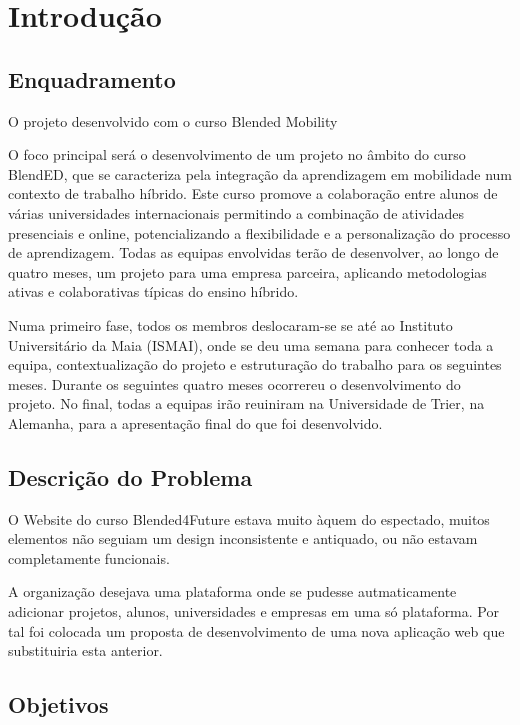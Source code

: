\chapter{Introdução}
\label{chap:introducao}

\section{Enquadramento}
\label{sec:introducao_enquadramento}

O projeto desenvolvido com o curso Blended Mobility

O foco principal será o desenvolvimento de um projeto no âmbito do curso BlendED, que se caracteriza pela integração da aprendizagem em mobilidade num contexto de trabalho híbrido. Este curso promove a colaboração entre alunos de várias universidades internacionais permitindo a combinação de atividades presenciais e online, potencializando a flexibilidade e a personalização do processo de aprendizagem. Todas as equipas envolvidas terão de desenvolver, ao longo de quatro meses, um projeto para uma empresa parceira, aplicando metodologias ativas e colaborativas típicas do ensino híbrido.

Numa primeiro fase, todos os membros deslocaram-se se até ao Instituto Universitário da Maia (ISMAI), onde se deu uma semana para conhecer toda a equipa, contextualização do projeto e estruturação do trabalho para os seguintes meses. Durante os seguintes quatro meses ocorrereu o desenvolvimento do projeto. No final, todas a equipas irão reuiniram na Universidade de Trier, na Alemanha, para a apresentação final do que foi desenvolvido.



\section{Descrição do Problema}
\label{sec:introducao_descproblema}

O Website do curso Blended4Future estava muito àquem do espectado, muitos elementos não seguiam um design inconsistente e antiquado, ou não estavam completamente funcionais. 

A organização desejava uma plataforma onde se pudesse autmaticamente adicionar projetos, alunos, universidades e empresas em uma só plataforma. Por tal foi colocada um proposta de desenvolvimento de uma nova aplicação web que substituiria esta anterior. 



\section{Objetivos}

